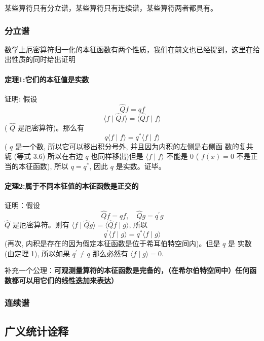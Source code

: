 		某些算符只有分立谱，某些算符只有连续谱，某些算符两者都具有。
			\subsubsection{分立谱}
				数学上厄密算符归一化的本征函数有两个性质，我们在前文也已经提到，这里在给出性质的同时给出证明
					\paragraph*{定理1:它们的本征值是实数\\}
						\par
						证明: 假设
						\begin{equation}
						\hat{Q} f=q f
						\end{equation}
						\begin{equation}
						\langle f \mid \hat{Q} f\rangle=\langle\hat{Q} f \mid f\rangle
						\end{equation}
						( $\hat{Q}$ 是厄密算符)。那么有
						\begin{equation}
						q\langle f \mid f\rangle=q^{*}\langle f \mid f\rangle
						\end{equation}
						( $q$ 是一个数, 所以它可以移出积分号外, 并且因为内积的左侧是右侧函 数的复共轭 (等式 3.6) 所以在右边 $q$ 也同样移出)但是 $\langle f \mid f\rangle$ 不能是 0 ( $f(x)=0$ 不是正当的本征函数), 所以 $q=q^{*}$, 因此 $q$ 是实数。证毕。
					\paragraph*{定理2:属于不同本征值的本征函数是正交的\\}
						\par
						证明：假设
						\begin{equation}
						\hat{Q} f=q f, \quad \hat{Q} g=q^{\prime} g
						\end{equation}
						$\hat{Q}$ 是厄密算符。则有 $\langle f \mid \hat{Q} g\rangle=\langle\hat{Q} f \mid g\rangle$, 所以
						\begin{equation}
						q^{\prime}\langle f \mid g\rangle=q^{*}\langle f \mid g\rangle
						\end{equation}
						(再次, 内积是存在的因为假定本征函数是位于希耳伯特空间内)。但是 $q$ 是 实数 (由定理 1), 所以如果 $q^{\prime} \neq q$ 那么必然有 $\langle f \mid g\rangle=0$.

				补充一个公理：\textbf{可观测量算符的本征函数是完备的，（在希尔伯特空间中）任何函数都可以用它们的线性迭加来表达）}
			\subsubsection{连续谱}
		\subsection{广义统计诠释}	
			
















